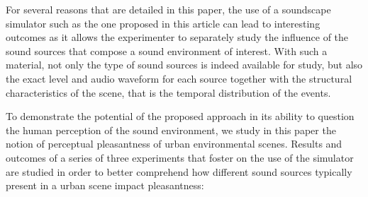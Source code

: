 \documentclass[preprint,12pt]{elsarticle}
\newcommand{\ie}{\emph{i.\,e.}}
\begin{document}
For several reasons that are detailed in this paper, the use of a soundscape simulator such as the one proposed in this article can lead to interesting outcomes as it allows the experimenter to separately study  the influence of the sound sources that compose a sound environment of interest. With such a material, not only the type of sound sources is indeed available for study, but also the exact level and audio waveform for each source together with the structural characteristics of the scene, that is the temporal distribution of the events.



To demonstrate the potential of the proposed approach in its ability to question the human perception of the sound environment, we study in this paper the notion of perceptual pleasantness of urban environmental scenes. Results and outcomes of a series of three experiments that foster on the use of the simulator are studied in order to better comprehend how different sound sources typically present in a urban scene impact pleasantness:

\end{document}
